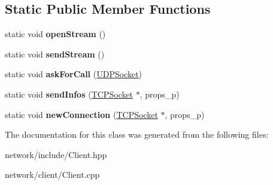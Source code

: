 \subsection*{Static Public Member Functions}
\begin{DoxyCompactItemize}
\item 
\mbox{\label{classcli_1_1_client_aefa4c51c339bb1e1c1e9854e67ae1367}} 
static void {\bfseries open\+Stream} ()
\item 
\mbox{\label{classcli_1_1_client_ad2cdcf3ed4ef4b588cc4b79cefb857e6}} 
static void {\bfseries send\+Stream} ()
\item 
\mbox{\label{classcli_1_1_client_a5646c53b99cbbde85ba917e81d53dbae}} 
static void {\bfseries ask\+For\+Call} (\hyperlink{class_u_d_p_socket}{U\+D\+P\+Socket})
\item 
\mbox{\label{classcli_1_1_client_a9bd449f1ba2df2727e6cc4a1b1db1f78}} 
static void {\bfseries send\+Infos} (\hyperlink{class_t_c_p_socket}{T\+C\+P\+Socket} $\ast$, props\+\_\+p)
\item 
\mbox{\label{classcli_1_1_client_ab3bf0efdc0b25735c0f2c1df93ef2f29}} 
static void {\bfseries new\+Connection} (\hyperlink{class_t_c_p_socket}{T\+C\+P\+Socket} $\ast$, props\+\_\+p)
\end{DoxyCompactItemize}


The documentation for this class was generated from the following files\+:\begin{DoxyCompactItemize}
\item 
network/include/Client.\+hpp\item 
network/client/Client.\+cpp\end{DoxyCompactItemize}
